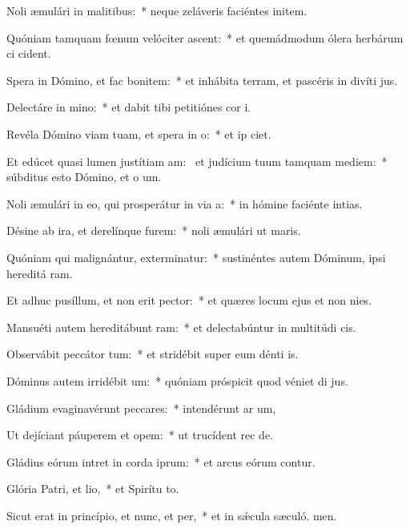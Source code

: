 \item Noli æmulári in malitibus:~* neque zeláveris faciéntes initem.
\item Quóniam tamquam fœnum velóciter ascent:~* et quemádmodum ólera herbárum ci cident.
\item Spera in Dómino, et fac bonitem:~* et inhábita terram, et pascéris in divíti jus.
\item Delectáre in mino:~* et dabit tibi petitiónes cor i.
\item Revéla Dómino viam tuam, et spera in o:~* et ip ciet.
\item Et edúcet quasi lumen justítiam am:~\pscross{} et judícium tuum tamquam mediem:~* súbditus esto Dómino, et o um.
\item Noli æmulári in eo, qui prosperátur in via a:~* in hómine faciénte intias.
\item Désine ab ira, et derelínque furem:~* noli æmulári ut maris.
\item Quóniam qui malignántur, exterminatur:~* sustinéntes autem Dóminum, ipsi hereditá ram.
\item Et adhuc pusíllum, et non erit pector:~* et quæres locum ejus et non nies.
\item Mansuéti autem hereditábunt ram:~* et delectabúntur in multitúdi cis.
\item Observábit peccátor tum:~* et stridébit super eum dénti is.
\item Dóminus autem irridébit um:~* quóniam próspicit quod véniet di jus.
\item Gládium evaginavérunt peccares:~* intendérunt ar um,
\item Ut dejíciant páuperem et opem:~* ut trucídent rec de.
\item Gládius eórum intret in corda iprum:~* et arcus eórum contur.
\item Glória Patri, et lio,~* et Spirítu to.
\item Sicut erat in princípio, et nunc, et per,~* et in sǽcula sæculó. men.
